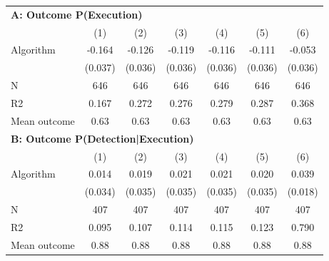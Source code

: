 \begin{tabular}{lcccccc} \toprule
\multicolumn{7}{l}{\textbf{A: Outcome P(Execution)}} \\ \multicolumn{1}{l}{} & (1) & (2) & (3) & (4) & (5) & (6) \\ \midrule
Algorithm   &      -0.164\sym{***}&      -0.126\sym{***}&      -0.119\sym{***}&      -0.116\sym{***}&      -0.111\sym{***}&      -0.053         \\
            &     (0.037)         &     (0.036)         &     (0.036)         &     (0.036)         &     (0.036)         &     (0.036)         \\
\midrule
N           &         646         &         646         &         646         &         646         &         646         &         646         \\
R2          &       0.167         &       0.272         &       0.276         &       0.279         &       0.287         &       0.368         \\
Mean outcome&        0.63         &        0.63         &        0.63         &        0.63         &        0.63         &        0.63         \\

\midrule \multicolumn{7}{l}{\textbf{B: Outcome P(Detection|Execution)}} \\ \multicolumn{1}{l}{} & (1) & (2) & (3) & (4) & (5) & (6) \\ \midrule
Algorithm   &       0.014         &       0.019         &       0.021         &       0.021         &       0.020         &       0.039\sym{**} \\
            &     (0.034)         &     (0.035)         &     (0.035)         &     (0.035)         &     (0.035)         &     (0.018)         \\
\midrule
N           &         407         &         407         &         407         &         407         &         407         &         407         \\
R2          &       0.095         &       0.107         &       0.114         &       0.115         &       0.123         &       0.790         \\
Mean outcome&        0.88         &        0.88         &        0.88         &        0.88         &        0.88         &        0.88         \\


\end{tabular}
